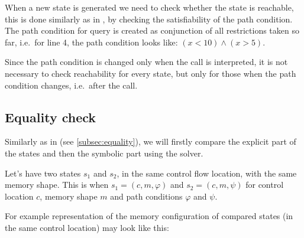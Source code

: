 When a new state is generated we need to check whether the state is reachable,
this is done similarly as in \SymDIVINE, by checking the satisfiability of the
path condition. The path condition for \SMT query is created as conjunction of
all restrictions taken so far, i.e.~for line 4, the path condition looks like:
$(x < 10) \wedge (x > 5)$.

Since the path condition is changed only when the  call is
interpreted, it is not necessary to check reachability for every state, but only
for those when the path condition changes, i.e.~after the  call.

\subsection{Equality check}

Similarly as in \SymDIVINE (see \autoref{subsec:equality}), we will firstly
compare the explicit part of the states and then the symbolic part using the
\SMT solver.

Let's have two states $s_1$ and $s_2$, in the same control flow location, with
the same memory shape. This is when $s_1 = (c, m, \varphi)$ and $s_2 = (c,
m, \psi)$ for control location $c$, memory shape $m$ and path conditions $\varphi$ and $\psi$.

For example representation of the memory configuration of compared states (in
the same control location) may look like this:


